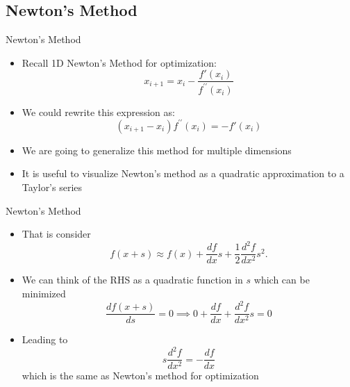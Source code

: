 \documentclass[xcolor=dvipsnames,11pt]{beamer}
\begin{document}
\subsection{Newton's Method}

\begin{frame}{Newton's Method}
	\begin{itemize}
		\item Recall 1D Newton's Method for optimization:
		$$x_{i+1} = x_{i} - \frac{f'(x_i)}{f^{\prime \prime}(x_i)}$$
		\vspace*{-\baselineskip}%
		\item We could rewrite this expression as:
		$$(x_{i+1} - x_{i})f^{\prime \prime}(x_i) = -f'(x_i)$$
		\vspace*{-\baselineskip}%
		\item We are going to generalize this method for multiple dimensions
		\item It is useful to visualize Newton's method as a quadratic approximation to a Taylor's series
	\end{itemize}
\end{frame}


\begin{frame}{Newton's Method}
	\begin{itemize}
		\item That is consider
		$$f(x+s) \approx f(x) + \dfrac{df}{dx} s + \dfrac{1}{2} \dfrac{d^2f}{dx^2} s^2.$$
		\vspace*{-\baselineskip}%
		\item We can think of the RHS as a quadratic function in $s$ which can be minimized
		$$\dfrac{df(x+s)}{ds} = 0 \implies 0 + \dfrac{df}{dx} + \dfrac{d^2f}{dx^2} s = 0$$
		\vspace*{-\baselineskip}%
		\item Leading to $$s \dfrac{d^2f}{dx^2} = - \dfrac{df}{dx}$$
		which is the same as Newton's method for optimization
	\end{itemize}
\end{frame}

\end{document}
